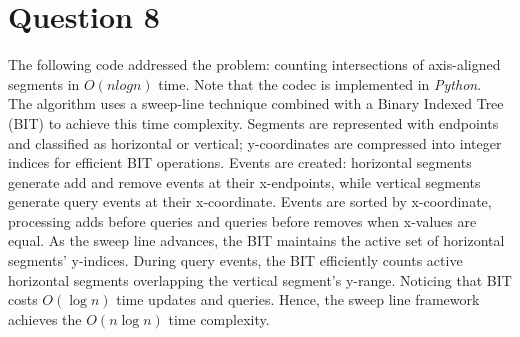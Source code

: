 \documentclass{article}
\begin{document}
\newpage

\section*{Question 8}
The following code addressed the problem: counting intersections of axis-aligned segments in $O(n log n)$ time. Note that the codec is implemented in \textit{Python}.
\\
The algorithm uses a sweep-line technique combined with a Binary Indexed Tree (BIT) to achieve this time complexity.
Segments are represented with endpoints and classified as horizontal or vertical; y-coordinates are compressed into integer indices for efficient BIT operations. 
Events are created: horizontal segments generate add and remove events at their x-endpoints, while vertical segments generate query events at their x-coordinate. 
Events are sorted by x-coordinate, processing adds before queries and queries before removes when x-values are equal. 
As the sweep line advances, the BIT maintains the active set of horizontal segments' y-indices. 
During query events, the BIT efficiently counts active horizontal segments overlapping the vertical segment's y-range.
Noticing that BIT costs \( O(\log n) \) time updates and queries. Hence, the sweep line framework achieves the \( O(n \log n) \) time complexity.
\end{document}
